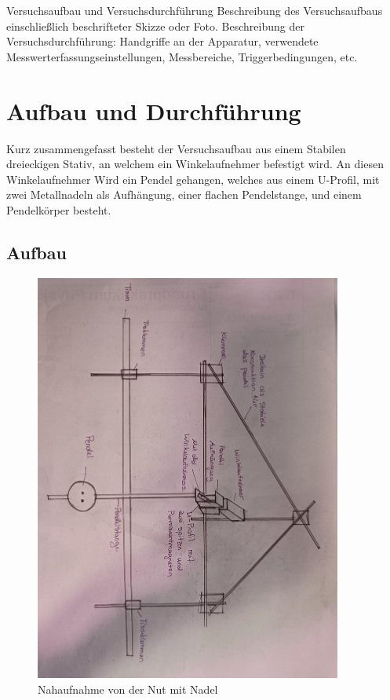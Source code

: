 \documentclass[twoside]{protokoll}
\begin{document}
\begin{aufgabe}{Versuchsaufbau und Versuchsdurchführung}
  Beschreibung des Versuchsaufbaus einschließlich beschrifteter Skizze
  oder Foto. Beschreibung der Versuchsdurchführung: Handgriffe an der
  Apparatur, verwendete Messwerterfassungseinstellungen, Messbereiche,
  Triggerbedingungen, etc.
\end{aufgabe}

\section{Aufbau und Durchführung}
Kurz zusammengefasst besteht der Versuchsaufbau aus einem Stabilen dreieckigen Stativ, an welchem ein Winkelaufnehmer befestigt wird.
An diesen Winkelaufnehmer Wird ein Pendel gehangen, welches aus einem U-Profil, mit zwei Metallnadeln als Aufhängung, einer flachen Pendelstange, und einem Pendelkörper besteht.\\
\subsection{Aufbau}
\begin{figure}[H]
    \centering
    \includegraphics[width=0.9\textwidth]{Bilder/Kompletter-Aufbau.pdf}
    \caption{Nahaufnahme von der Nut mit Nadel}
\end{figure}
\end{document}
